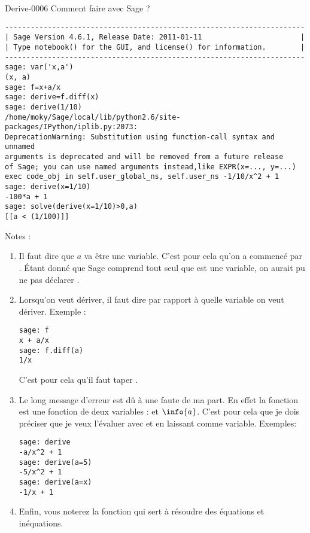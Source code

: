 \begin{corrige}{Derive-0006}
    Comment faire avec Sage ?
    \begin{verbatim}
----------------------------------------------------------------------
| Sage Version 4.6.1, Release Date: 2011-01-11                       |
| Type notebook() for the GUI, and license() for information.        |
----------------------------------------------------------------------
sage: var('x,a')
(x, a)
sage: f=x+a/x
sage: derive=f.diff(x)
sage: derive(1/10)
/home/moky/Sage/local/lib/python2.6/site-packages/IPython/iplib.py:2073: 
DeprecationWarning: Substitution using function-call syntax and unnamed
arguments is deprecated and will be removed from a future release
of Sage; you can use named arguments instead,like EXPR(x=..., y=...)
exec code_obj in self.user_global_ns, self.user_ns -1/10/x^2 + 1
sage: derive(x=1/10)
-100*a + 1
sage: solve(derive(x=1/10)>0,a)
[[a < (1/100)]]
    \end{verbatim}
    Notes :
    \begin{enumerate}
        \item
            Il faut dire que $a$ va être une variable. C'est pour cela qu'on a commencé par . Étant donné que Sage comprend tout seul que  est une variable, on aurait pu ne pas déclarer .
        \item
            Lorsqu'on veut dériver, il faut dire par rapport à quelle variable on veut dériver. Exemple :
            \begin{verbatim}
sage: f
x + a/x
sage: f.diff(a)
1/x
            \end{verbatim}
            C'est pour cela qu'il faut taper .
        \item
            Le long message d'erreur  est dû à une faute de ma part. En effet la fonction  est une fonction de deux variables :  et $\info{a}$. C'est pour cela que je dois préciser que je veux l'évaluer avec  et en laissant  comme variable. Exemples:
            \begin{verbatim}
sage: derive
-a/x^2 + 1
sage: derive(a=5)
-5/x^2 + 1
sage: derive(a=x)
-1/x + 1
            \end{verbatim}
        \item
            Enfin, vous noterez la fonction  qui sert à résoudre des équations et inéquations.

    \end{enumerate}

\end{corrige}
